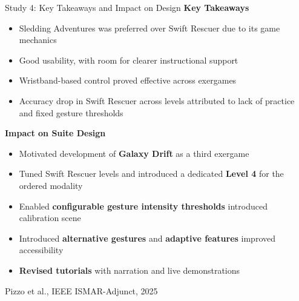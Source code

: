 \documentclass[aspectratio=169, 12pt]{beamer}
\newcommand{\citefooter}[1]{\hfill{\tiny #1}}
\begin{document}
\begin{frame}{Study 4: Key Takeaways and Impact on Design}
	\textbf{\textcolor{gbAqua}{Key Takeaways}}
	
	\begin{itemize}
		\item Sledding Adventures was preferred over Swift Rescuer due to its game mechanics 
		\item Good usability, with room for clearer instructional support
		\item Wristband-based control proved effective across exergames
		\item Accuracy drop in Swift Rescuer across levels attributed to lack of practice and fixed gesture thresholds
	\end{itemize}
	
	\vspace{0.3cm}
	
	\textbf{\textcolor{gbAqua}{Impact on Suite Design}}
	
	\begin{itemize}
		\item Motivated development of \textbf{Galaxy Drift} as a third exergame
		\item Tuned Swift Rescuer levels and introduced a dedicated \textbf{Level 4} for the ordered modality
		\item Enabled \textbf{configurable gesture intensity thresholds} introduced calibration scene
		\item Introduced \textbf{alternative gestures} and \textbf{adaptive features} improved accessibility
		\item \textbf{Revised tutorials} with narration and live demonstrations
	\end{itemize}
	
	
	\citefooter{Pizzo et al., IEEE ISMAR-Adjunct, 2025}
\end{frame}
\end{document}
